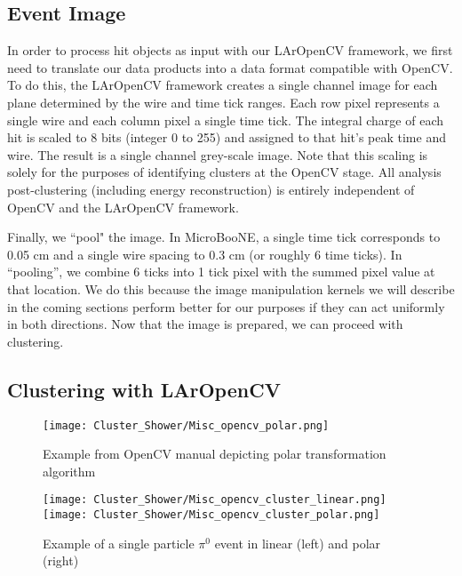 \subsection{Event Image}
\par In order to process hit objects as input with our LArOpenCV framework, we first need to translate our data products into a data format compatible with OpenCV. To do this, the LArOpenCV framework creates a single channel image for each plane determined by the wire and time tick ranges. Each row pixel represents a single wire and each column pixel a single time tick. The integral charge of each hit is scaled to 8 bits (integer 0 to 255) and assigned to that hit's peak time and wire. The result is a single channel grey-scale image. Note that this scaling is solely for the purposes of identifying clusters at the OpenCV stage. All analysis post-clustering (including energy reconstruction) is entirely independent of OpenCV and the LArOpenCV framework. 
\par Finally, we ``pool" the image. In MicroBooNE, a single time tick corresponds to 0.05 cm and a single wire spacing to 0.3 cm (or roughly 6 time ticks).  In ``pooling'', we combine 6 ticks into 1 tick pixel with the summed pixel value at that location. We do this because the image manipulation kernels we will describe in the coming sections perform better for our purposes if they can act uniformly in both directions. Now that the image is prepared, we can proceed with clustering.
\subsection{Clustering with LArOpenCV }

\begin{figure}[h!]
\centering
\texttt{[image: Cluster\_Shower/Misc\_opencv\_polar.png]}
\caption{ Example from OpenCV manual depicting polar transformation algorithm \cite{bib:linearPolar}}
\label{fig:polar}
\end{figure}

\begin{figure}[h!]
\centering
\texttt{[image: Cluster\_Shower/Misc\_opencv\_cluster\_linear.png]}
\texttt{[image: Cluster\_Shower/Misc\_opencv\_cluster\_polar.png]}

\caption{ Example of a single particle $\pi^0$ event in linear (left) and polar (right)}
\label{fig:pi0_polar}
\end{figure}


